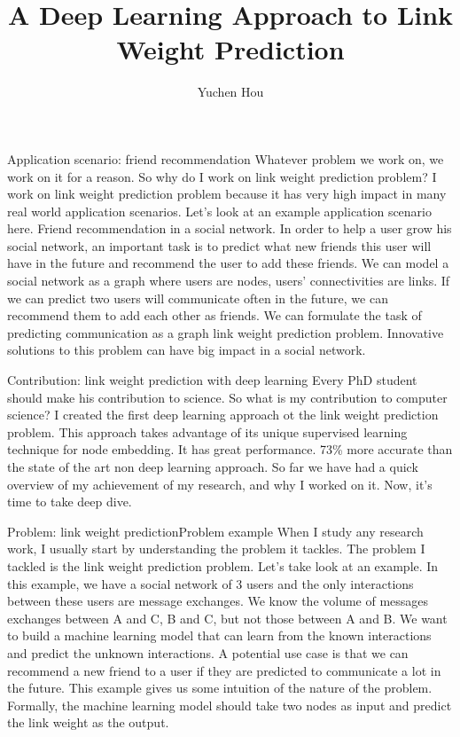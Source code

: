 \documentclass{beamer}
\title{A Deep Learning Approach to Link Weight Prediction}
\author{Yuchen Hou}
\date{}
\begin{document}

\begin{frame}{Application scenario: friend recommendation}
Whatever problem we work on, we work on it for a reason. So why do I work on link weight prediction problem? I work on link weight prediction problem because it has very high impact in many real world application scenarios. Let's look at an example application scenario here. Friend recommendation in a social network. In order to help a user grow his social network, an important task is to predict what new friends this user will have in the future and recommend the user to add these friends. We can model a social network as a graph where users are nodes, users' connectivities are links. If we can predict two users will communicate often in the future, we can recommend them to add each other as friends. We can formulate the task of predicting communication as a graph link weight prediction problem. Innovative solutions to this problem can have big impact in a social network.
\end{frame}

\begin{frame}{Contribution: link weight prediction with deep learning}
Every PhD student should make his contribution to science. So what is my contribution to computer science? I created the first deep learning approach ot the link weight prediction problem. This approach takes advantage of its unique supervised learning technique for node embedding. It has great performance. 73\% more accurate than the state of the art non deep learning approach. So far we have had a quick overview of my achievement of my research, and why I worked on it. Now, it's time to take deep dive.
\end{frame}

\begin{frame}{Problem: link weight prediction}{Problem example}
When I study any research work, I usually start by understanding the problem it tackles. The problem I tackled is the link weight prediction problem. Let's take look at an example. In this example, we have a social network of 3 users and the only interactions between these users are message exchanges. We know the volume of messages exchanges between A and C, B and C, but not those between A and B. We want to build a machine learning model that can learn from the known interactions and predict the unknown interactions. A potential use case is that we can recommend a new friend to a user if they are predicted to communicate a lot in the future. This example gives us some intuition of the nature of the problem. Formally, the machine learning model should take two nodes as input and predict the link weight as the output.
\end{frame}
\end{document}
